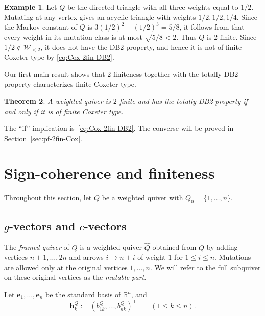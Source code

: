 \documentclass[11pt,reqno]{amsart}
\numberwithin{equation}{section}
\theoremstyle{definition}
\newtheorem{example}{Example}[section]
\theoremstyle{plain}
\newtheorem{theorem}[example]{Theorem}
\begin{document}
	\begin{example}\label{ex:2fin-non-Cox}
		Let $Q$ be the directed triangle with all three weights equal to $1/2$. Mutating at any vertex gives an acyclic triangle with weights $1/2,1/2,1/4$. Since the Markov constant of $Q$ is $3(1/2)^2-(1/2)^3=5/8$, it follows from \cite[Proposition~1.2]{CK26} that every weight in its mutation class is at most $\sqrt{5/8}<2$. Thus $Q$ is $2$-finite. Since $1/2\notin\mathcal W_{<2}$, it does not have the DB2-property, and hence it is not of finite Coxeter type by \eqref{eq:Cox-2fin-DB2}.
	\end{example}
	
	Our first main result shows that $2$-finiteness together with the totally DB2-property characterizes finite Coxeter type.
	
	\begin{theorem}\label{thm:2fin-Cox}
		A weighted quiver is $2$-finite and has the totally DB2-property if and only if it is of finite Coxeter type.
	\end{theorem}
	
	The ``if'' implication is~\eqref{eq:Cox-2fin-DB2}. The converse will be proved in Section~\ref{sec:pf-2fin-Cox}.

\section{Sign-coherence and finiteness}\label{sec:sign}
	Throughout this section, let $Q$ be a weighted quiver with $Q_0=\{1,\ldots,n\}$.
\subsection{\texorpdfstring{$g$}{g}-vectors and \texorpdfstring{$c$}{c}-vectors}
	The \emph{framed quiver} of $Q$ is a weighted quiver $\hat Q$ obtained from $Q$ by adding vertices $n+1,\ldots,2n$ and arrows $i\to n+i$ of weight $1$ for $1\leq i\leq n$. Mutations are allowed only at the original vertices $1,\ldots,n$. We will refer to the full subquiver on these original vertices as the \emph{mutable part}.

  Let $\mathbf e_1,\ldots,\mathbf e_n$ be the standard basis of $\mathbb R^n$, and
	\[
	\mathbf b_k^Q:=(b_{1k}^Q,\ldots,b_{nk}^Q)^{\mathsf T}
	\qquad(1\leq k\leq n).
	\]
	
\end{document}
